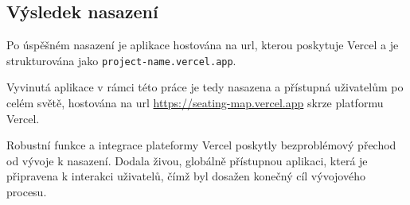 \subsection{Výsledek nasazení}
\label{subsec:implementace-vysledek-nasazeni}
Po úspěšném nasazení je aplikace hostována na \acs{url}, kterou poskytuje Vercel a je strukturována jako \texttt{project-name.vercel.app}.

Vyvinutá aplikace v rámci této práce je tedy nasazena a přístupná uživatelům po celém světě, hostována na \ac{url} \url{https://seating-map.vercel.app} skrze platformu Vercel.

Robustní funkce a integrace plateformy Vercel poskytly bezproblémový přechod od vývoje k nasazení.
Dodala živou, globálně přístupnou aplikaci, která je připravena k interakci uživatelů, čímž byl dosažen konečný cíl vývojového procesu.
